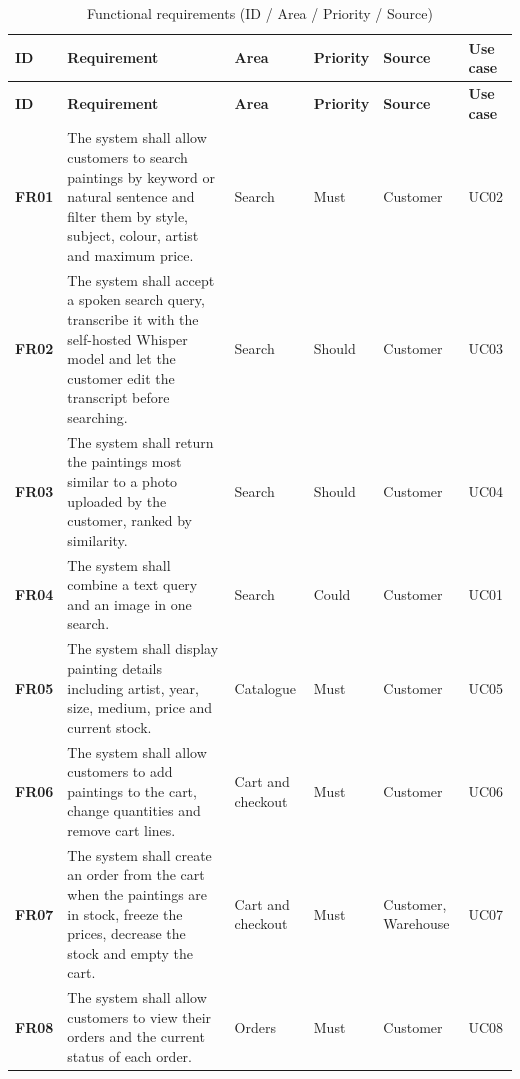 \begin{longtable}{@{}P{1.2cm}P{5.5cm}P{2.4cm}P{1.35cm}P{2.3cm}P{1.75cm}@{}}
\caption{Functional requirements (ID / Area / Priority / Source)}\label{tab:fr}\\
\toprule
\small \textbf{ID} & \small \textbf{Requirement} & \small \textbf{Area} & \small \textbf{Priority} & \small \textbf{Source} & \small \textbf{Use case}\\
\midrule
\endfirsthead
\toprule
\small \textbf{ID} & \small \textbf{Requirement} & \small \textbf{Area} & \small \textbf{Priority} & \small \textbf{Source} & \small \textbf{Use case}\\
\midrule
\endhead
\bottomrule
\endlastfoot
\small \textbf{FR01} & \small The system shall allow customers to search paintings by keyword or natural sentence and filter them by style, subject, colour, artist and maximum price. & \small Search & \small Must & \small Customer & \small UC02\\
\small \textbf{FR02} & \small The system shall accept a spoken search query, transcribe it with the self-hosted Whisper model and let the customer edit the transcript before searching. & \small Search & \small Should & \small Customer & \small UC03\\
\small \textbf{FR03} & \small The system shall return the paintings most similar to a photo uploaded by the customer, ranked by similarity. & \small Search & \small Should & \small Customer & \small UC04\\
\small \textbf{FR04} & \small The system shall combine a text query and an image in one search. & \small Search & \small Could & \small Customer & \small UC01\\
\small \textbf{FR05} & \small The system shall display painting details including artist, year, size, medium, price and current stock. & \small Catalogue & \small Must & \small Customer & \small UC05\\
\small \textbf{FR06} & \small The system shall allow customers to add paintings to the cart, change quantities and remove cart lines. & \small Cart and checkout & \small Must & \small Customer & \small UC06\\
\small \textbf{FR07} & \small The system shall create an order from the cart when the paintings are in stock, freeze the prices, decrease the stock and empty the cart. & \small Cart and checkout & \small Must & \small Customer, Warehouse & \small UC07\\
\small \textbf{FR08} & \small The system shall allow customers to view their orders and the current status of each order. & \small Orders & \small Must & \small Customer & \small UC08\\

\end{longtable}
